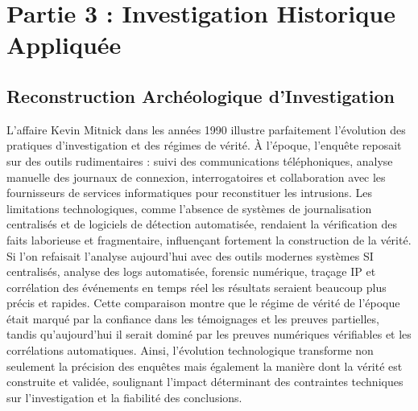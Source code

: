 \documentclass[11pt,a4paper]{article}
\begin{document}
\section{Partie 3 : Investigation Historique Appliquée}

\subsection{Reconstruction Archéologique d’Investigation}

L’affaire Kevin Mitnick dans les années 1990 illustre parfaitement l’évolution des pratiques d’investigation et des régimes de vérité. À l’époque, l’enquête reposait sur des outils rudimentaires : suivi des communications téléphoniques, analyse manuelle des journaux de connexion, interrogatoires et collaboration avec les fournisseurs de services informatiques pour reconstituer les intrusions. Les limitations technologiques, comme l’absence de systèmes de journalisation centralisés et de logiciels de détection automatisée, rendaient la vérification des faits laborieuse et fragmentaire, influençant fortement la construction de la vérité. Si l’on refaisait l’analyse aujourd’hui avec des outils modernes systèmes SI centralisés, analyse des logs automatisée, forensic numérique, traçage IP et corrélation des événements en temps réel les résultats seraient beaucoup plus précis et rapides. Cette comparaison montre que le régime de vérité de l’époque était marqué par la confiance dans les témoignages et les preuves partielles, tandis qu’aujourd’hui il serait dominé par les preuves numériques vérifiables et les corrélations automatiques. Ainsi, l’évolution technologique transforme non seulement la précision des enquêtes mais également la manière dont la vérité est construite et validée, soulignant l’impact déterminant des contraintes techniques sur l’investigation et la fiabilité des conclusions.
\end{document}
